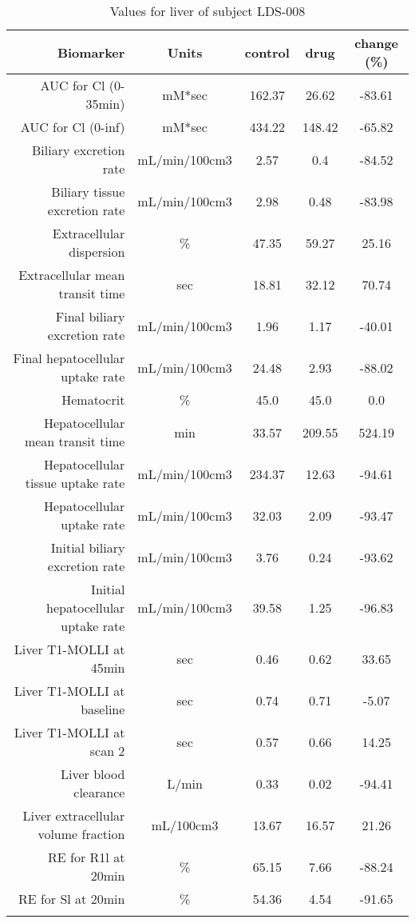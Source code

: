 \documentclass{epflreport}%
\begin{document}
%
\clearpage%
\begin{longtable}{rcccc}%
\hline%
Biomarker&Units&control&drug&change (\%)\\%
\hline%
AUC for Cl (0{-}35min)&mM*sec&162.37&26.62&{-}83.61\\%
AUC for Cl (0{-}inf)&mM*sec&434.22&148.42&{-}65.82\\%
Biliary excretion rate&mL/min/100cm3&2.57&0.4&{-}84.52\\%
Biliary tissue excretion rate&mL/min/100cm3&2.98&0.48&{-}83.98\\%
Extracellular dispersion&\%&47.35&59.27&25.16\\%
Extracellular mean transit time&sec&18.81&32.12&70.74\\%
Final biliary excretion rate&mL/min/100cm3&1.96&1.17&{-}40.01\\%
Final hepatocellular uptake rate&mL/min/100cm3&24.48&2.93&{-}88.02\\%
Hematocrit&\%&45.0&45.0&0.0\\%
Hepatocellular mean transit time&min&33.57&209.55&524.19\\%
Hepatocellular tissue uptake rate&mL/min/100cm3&234.37&12.63&{-}94.61\\%
Hepatocellular uptake rate&mL/min/100cm3&32.03&2.09&{-}93.47\\%
Initial biliary excretion rate&mL/min/100cm3&3.76&0.24&{-}93.62\\%
Initial hepatocellular uptake rate&mL/min/100cm3&39.58&1.25&{-}96.83\\%
Liver T1{-}MOLLI at 45min&sec&0.46&0.62&33.65\\%
Liver T1{-}MOLLI at baseline&sec&0.74&0.71&{-}5.07\\%
Liver T1{-}MOLLI at scan 2&sec&0.57&0.66&14.25\\%
Liver blood clearance&L/min&0.33&0.02&{-}94.41\\%
Liver extracellular volume fraction&mL/100cm3&13.67&16.57&21.26\\%
RE for R1l at 20min&\%&65.15&7.66&{-}88.24\\%
RE for Sl at 20min&\%&54.36&4.54&{-}91.65\\%
\hline%
\caption{Values for liver of subject LDS-008} \\%
\end{longtable}%
\end{document}
